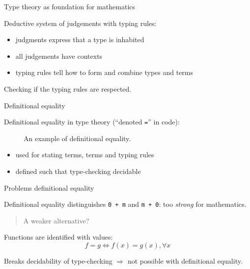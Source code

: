 \documentclass[english]{beamer}
\begin{document}
\begin{frame}{Type theory as foundation for mathematics}

    Deductive system of judgements with typing rules:


    \begin{prooftree}
    \end{prooftree}

    \begin{itemize}
    \item judgments express that a type is inhabited
    \item all judgements have contexts
    \item typing rules tell how to form and combine types and terms
    \end{itemize}
    
    \begin{definition}
    Checking if the typing rules are respected.
    \end{definition}
    
\end{frame}


\begin{frame}{Definitional equality}
    
    Definitional equality in type theory (``denoted \texttt{=}'' in code):

    \begin{figure}
    
    \caption{An example of definitional equality.}
    \end{figure}

    \begin{itemize}
     \item used for stating terms, terms and typing rules
     \item defined such that type-checking decidable
    \end{itemize}
    
    
    
\end{frame}

\begin{frame}{Problems definitional equality}

Definitional equality distinguishes  \texttt{0 + m} and \texttt{m + 0}: too \emph{strong} for mathematics.

\begin{quotation}
A weaker alternative?
\end{quotation}

\begin{example}

Functions are identified with values:
     \[f = g \Leftrightarrow f(x) = g(x), \forall x \]
    
    Breaks decidability of type-checking $\Rightarrow$ not possible with definitional equality.
    \end{example}
    

    
    
\end{frame}
\end{document}
